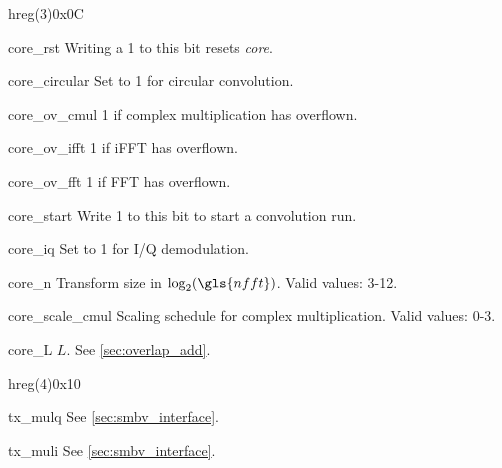 \documentclass[12pt,a4paper,parskip=full,abstract=true,BCOR=12mm,twoside,open=right]{scrreprt}
\def\device#1{\textit{#1}}
\begin{document}
\begin{register}{h}{reg(3)}{0x0C}%
    \label{reg3}%
    \regnewline%
    \begin{regdesc}\begin{reglist}
        \item[core\_rst] Writing a 1 to this bit resets \device{core}.
        \item[core\_circular] Set to 1 for circular convolution.
        \item[core\_ov\_cmul] 1 if complex multiplication has overflown.
        \item[core\_ov\_ifft] 1 if iFFT has overflown.
        \item[core\_ov\_fft] 1 if FFT has overflown.
        \item[core\_start] Write 1 to this bit to start a convolution run.
        \item[core\_iq] Set to 1 for I/Q demodulation.
        \item[core\_n] Transform size in $\log_2(\gls{nfft})$. Valid values: 3-12.
        \item[core\_scale\_cmul] Scaling schedule for complex multiplication. Valid values: 0-3.
        \item[core\_L] $L$. See \cref{sec:overlap_add}.
    \end{reglist}\end{regdesc}
\end{register}
\begin{register}{h}{reg(4)}{0x10}%
    \label{reg4}%
    \regnewline%
    \begin{regdesc}\begin{reglist}[tx\_mulq]
        \item[tx\_mulq] See \cref{sec:smbv_interface}.
        \item[tx\_muli] See \cref{sec:smbv_interface}.
    \end{reglist}\end{regdesc}
\end{register}
\end{document}
